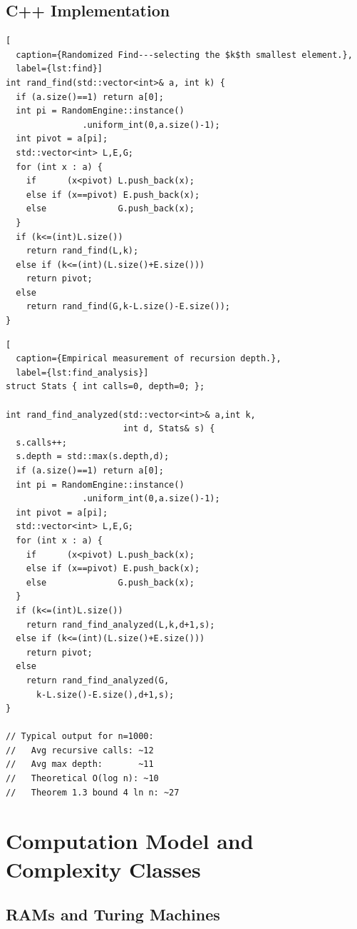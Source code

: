 \documentclass[twoside,12pt]{book}
\theoremstyle{plain}
\theoremstyle{definition}
\theoremstyle{remark}
\begin{document}
\subsection{C++ Implementation}

\begin{lstlisting}[
  caption={Randomized Find---selecting the $k$th smallest element.},
  label={lst:find}]
int rand_find(std::vector<int>& a, int k) {
  if (a.size()==1) return a[0];
  int pi = RandomEngine::instance()
               .uniform_int(0,a.size()-1);
  int pivot = a[pi];
  std::vector<int> L,E,G;
  for (int x : a) {
    if      (x<pivot) L.push_back(x);
    else if (x==pivot) E.push_back(x);
    else              G.push_back(x);
  }
  if (k<=(int)L.size())
    return rand_find(L,k);
  else if (k<=(int)(L.size()+E.size()))
    return pivot;
  else
    return rand_find(G,k-L.size()-E.size());
}
\end{lstlisting}

\begin{lstlisting}[
  caption={Empirical measurement of recursion depth.},
  label={lst:find_analysis}]
struct Stats { int calls=0, depth=0; };

int rand_find_analyzed(std::vector<int>& a,int k,
                       int d, Stats& s) {
  s.calls++;
  s.depth = std::max(s.depth,d);
  if (a.size()==1) return a[0];
  int pi = RandomEngine::instance()
               .uniform_int(0,a.size()-1);
  int pivot = a[pi];
  std::vector<int> L,E,G;
  for (int x : a) {
    if      (x<pivot) L.push_back(x);
    else if (x==pivot) E.push_back(x);
    else              G.push_back(x);
  }
  if (k<=(int)L.size())
    return rand_find_analyzed(L,k,d+1,s);
  else if (k<=(int)(L.size()+E.size()))
    return pivot;
  else
    return rand_find_analyzed(G,
      k-L.size()-E.size(),d+1,s);
}

// Typical output for n=1000:
//   Avg recursive calls: ~12
//   Avg max depth:       ~11
//   Theoretical O(log n): ~10
//   Theorem 1.3 bound 4 ln n: ~27
\end{lstlisting}

\section{Computation Model and Complexity Classes}
\label{sec:complexity}

\subsection{RAMs and Turing Machines}
\end{document}
